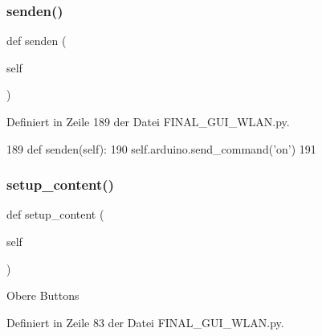 \subsubsection{\texorpdfstring{senden()}{senden()}}
{\footnotesize\ttfamily def senden (\begin{DoxyParamCaption}\item[{}]{self }\end{DoxyParamCaption})}



Definiert in Zeile 189 der Datei F\+I\+N\+A\+L\+\_\+\+G\+U\+I\+\_\+\+W\+L\+A\+N.\+py.


\begin{DoxyCode}
189     \textcolor{keyword}{def }senden(self):
190         self.arduino.send\_command(\textcolor{stringliteral}{'on'})
191     
\end{DoxyCode}
\mbox{\label{class_f_i_n_a_l___g_u_i___w_l_a_n_1_1_w_l_a_n_ab6e6fe2e785e29f0597e4fcdd3ec9063}} 
\subsubsection{\texorpdfstring{setup\+\_\+content()}{setup\_content()}}
{\footnotesize\ttfamily def setup\+\_\+content (\begin{DoxyParamCaption}\item[{}]{self }\end{DoxyParamCaption})}

\begin{DoxyVerb}Obere Buttons\end{DoxyVerb}
 

Definiert in Zeile 83 der Datei F\+I\+N\+A\+L\+\_\+\+G\+U\+I\+\_\+\+W\+L\+A\+N.\+py.


